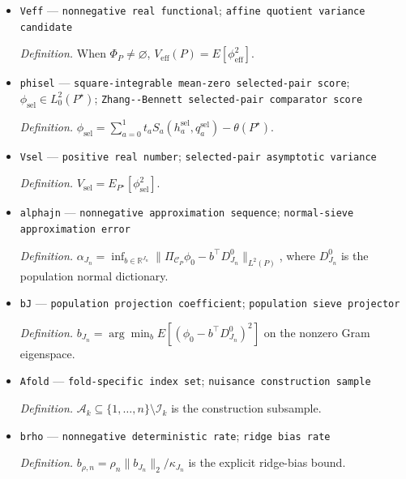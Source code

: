 \documentclass{article}
\begin{document}
\begin{itemize}
  \par\smallskip\noindent\emph{Definition.} When score-lifting completeness holds and \(\Phi_P\neq\varnothing\), \(\phi_{\mathrm{eff}}\) is the minimum-norm element of \(\mathcal A_P\) and the canonical gradient in the actual joint-model tangent space.
  \item \texttt{Veff} --- \texttt{nonnegative real functional}; \texttt{affine quotient variance candidate}
  \par\smallskip\noindent\emph{Definition.} When \(\Phi_P\neq\varnothing\), \(V_{\mathrm{eff}}(P)=E[\phi_{\mathrm{eff}}^2]\).
  \item \texttt{phisel} --- \texttt{square-\allowbreak{}integrable mean-\allowbreak{}zero selected-\allowbreak{}pair score}; \(\phi_{\mathrm{sel}}\in L_0^2(P^\star)\); \texttt{Zhang-\allowbreak{}-\allowbreak{}Bennett selected-\allowbreak{}pair comparator score}
  \par\smallskip\noindent\emph{Definition.} \(\phi_{\mathrm{sel}}=\sum_{a=0}^1t_aS_a(h_a^{\mathrm{sel}},q_a^{\mathrm{sel}})-\theta(P^\star)\).
  \item \texttt{Vsel} --- \texttt{positive real number}; \texttt{selected-\allowbreak{}pair asymptotic variance}
  \par\smallskip\noindent\emph{Definition.} \(V_{\mathrm{sel}}=E_{P^\star}[\phi_{\mathrm{sel}}^2]\).
  \item \texttt{alphajn} --- \texttt{nonnegative approximation sequence}; \texttt{normal-\allowbreak{}sieve approximation error}
  \par\smallskip\noindent\emph{Definition.} \(\alpha_{J_n}=\inf_{b\in\mathbb R^{J_n}}\|\Pi_{\mathcal C_P}\phi_0-b^\top D^0_{J_n}\|_{L^2(P)}\), where \(D^0_{J_n}\) is the population normal dictionary.
  \item \texttt{bJ} --- \texttt{population projection coefficient}; \texttt{population sieve projector}
  \par\smallskip\noindent\emph{Definition.} \(b_{J_n}=\arg\min_b E[(\phi_0-b^\top D^0_{J_n})^2]\) on the nonzero Gram eigenspace.
  \item \texttt{Afold} --- \texttt{fold-\allowbreak{}specific index set}; \texttt{nuisance construction sample}
  \par\smallskip\noindent\emph{Definition.} \(\mathcal A_k\subseteq\{1,\ldots,n\}\setminus\mathcal I_k\) is the construction subsample.
  \item \texttt{brho} --- \texttt{nonnegative deterministic rate}; \texttt{ridge bias rate}
  \par\smallskip\noindent\emph{Definition.} \(b_{\rho,n}=\rho_n\|b_{J_n}\|_2/\kappa_{J_n}\) is the explicit ridge-bias bound.

\end{itemize}
\end{document}
